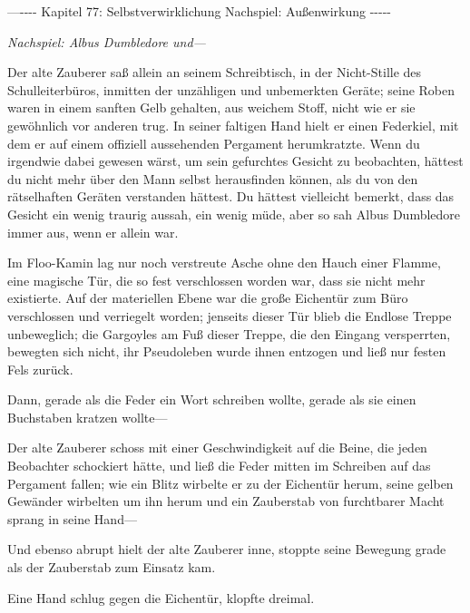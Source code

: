 

\hypertarget{selbstverwirklichung-nachspiel-auuxdfenwirkung}{%

—\/-\/-\/-\/- Kapitel 77: Selbstverwirklichung Nachspiel: Außenwirkung -\/-\/-\/-\/-

\emph{Nachspiel: Albus Dumbledore und—}

Der alte Zauberer saß allein an seinem Schreibtisch, in der Nicht-Stille des Schulleiterbüros, inmitten der unzähligen und unbemerkten Geräte; seine Roben waren in einem sanften Gelb gehalten, aus weichem Stoff, nicht wie er sie gewöhnlich vor anderen trug. In seiner faltigen Hand hielt er einen Federkiel, mit dem er auf einem offiziell aussehenden Pergament herumkratzte. Wenn du irgendwie dabei gewesen wärst, um sein gefurchtes Gesicht zu beobachten, hättest du nicht mehr über den Mann selbst herausfinden können, als du von den rätselhaften Geräten verstanden hättest. Du hättest vielleicht bemerkt, dass das Gesicht ein wenig traurig aussah, ein wenig müde, aber so sah Albus Dumbledore immer aus, wenn er allein war.

Im Floo-Kamin lag nur noch verstreute Asche ohne den Hauch einer Flamme, eine magische Tür, die so fest verschlossen worden war, dass sie nicht mehr existierte. Auf der materiellen Ebene war die große Eichentür zum Büro verschlossen und verriegelt worden; jenseits dieser Tür blieb die Endlose Treppe unbeweglich; die Gargoyles am Fuß dieser Treppe, die den Eingang versperrten, bewegten sich nicht, ihr Pseudoleben wurde ihnen entzogen und ließ nur festen Fels zurück.

Dann, gerade als die Feder ein Wort schreiben wollte, gerade als sie einen Buchstaben kratzen wollte—

Der alte Zauberer schoss mit einer Geschwindigkeit auf die Beine, die jeden Beobachter schockiert hätte, und ließ die Feder mitten im Schreiben auf das Pergament fallen; wie ein Blitz wirbelte er zu der Eichentür herum, seine gelben Gewänder wirbelten um ihn herum und ein Zauberstab von furchtbarer Macht sprang in seine Hand—

Und ebenso abrupt hielt der alte Zauberer inne, stoppte seine Bewegung grade als der Zauberstab zum Einsatz kam.

Eine Hand schlug gegen die Eichentür, klopfte dreimal.

}
